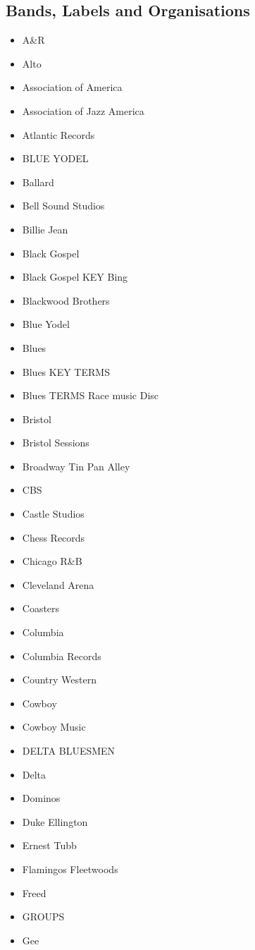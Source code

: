\documentclass[12pt,a4paper]{article}
\begin{document}
\subsection{Bands, Labels and Organisations}
\begin{itemize}
  \item A\&R
  \item Alto
  \item Association of America
  \item Association of Jazz America
  \item Atlantic Records
  \item BLUE YODEL
  \item Ballard
  \item Bell Sound Studios
  \item Billie Jean
  \item Black Gospel
  \item Black Gospel KEY Bing
  \item Blackwood Brothers
  \item Blue Yodel
  \item Blues
  \item Blues KEY TERMS
  \item Blues TERMS Race music Disc
  \item Bristol
  \item Bristol Sessions
  \item Broadway Tin Pan Alley
  \item CBS
  \item Castle Studios
  \item Chess Records
  \item Chicago R\&B
  \item Cleveland Arena
  \item Coasters
  \item Columbia
  \item Columbia Records
  \item Country Western
  \item Cowboy
  \item Cowboy Music
  \item DELTA BLUESMEN
  \item Delta
  \item Dominos
  \item Duke Ellington
  \item Ernest Tubb
  \item Flamingos Fleetwoods
  \item Freed
  \item GROUPS
  \item Gee

\end{itemize}
\end{document}
